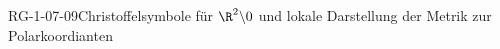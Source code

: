 
\begin{EXA}{RG-1-07-09}{Christoffelsymbole für $\R^2\backslash 0$ und lokale Darstellung der Metrik zur Polarkoordianten}
\end{EXA}
